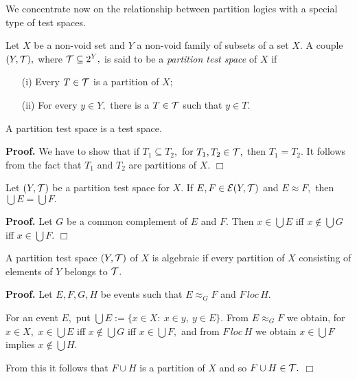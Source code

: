 We concentrate now on the relationship between partition logics
with a special type of test spaces.

Let $X$ be a non-void set and $Y$ a non-void family of subsets
of a set $X.$ A couple $(Y,{\cal T}),$ where $ {\cal T}
\subseteq  2^Y,$ is said to be a {\it partition test space} of
$X$ if
\begin{enumerate}
\item[{\rm (i)}]    Every $T \in {\cal T}$ is a partition of $X$;  \vspace{-2mm}
\item[{\rm (ii)}]      For every $y \in Y,$ there is a $T \in
{\cal T}$ such that $y \in T.$
\end{enumerate}

\begin{proposition}\label{prop8.1} A partition test space is  a
test space.
\end{proposition}

{\bf Proof.} We have to show that if $T_1 \subseteq T_2,$ for
$T_1, T_2 \in {\cal T},$ then $T_1 = T_2.$ It follows from the
fact that $T_1$ and $T_2$ are partitions  of $X$.
\hfill $\Box$

\begin{proposition}\label{prop8.2} Let $(Y,{\cal T})$ be a partition
test space for $X.$ If $E, F \in {\cal E}(Y,{\cal T})$ and $E
\approx F,$ then $\bigcup E = \bigcup F.$
\end{proposition}

{\bf Proof.}  Let $G$ be a common complement of $E$ and $F.$ Then
$x \in \bigcup E$ iff $x \not\in \bigcup G$ iff $x \in \bigcup F.$
\hfill $\Box$

\begin{proposition} \label{prop8.3} A partition test space
$(Y,{\cal T})$ of $X$ is algebraic if every partition of $X$ consisting
of elements of $Y$ belongs to $\cal T.$
\end{proposition}

{\bf Proof.} Let $E,F,G,H$ be events such  that $E \approx_G F$
and $F\, loc\, H.$

For an event $E,$ put $\bigcup E:= \{x \in X:\ x \in y,\ y \in
E\}.$ From $E \approx_G F$ we obtain, for $x \in X,$ $x \in
\bigcup E$ iff $x \not\in \bigcup G$ iff $x \in \bigcup F,$ and from
$F\, loc\ H$ we obtain $x \in \bigcup F$ implies $x \not\in
\bigcup H.$

From this it follows that $F \cup H$ is a partition of $X$ and
so $F \cup H \in {\cal T}.$
\hfill $\Box$



